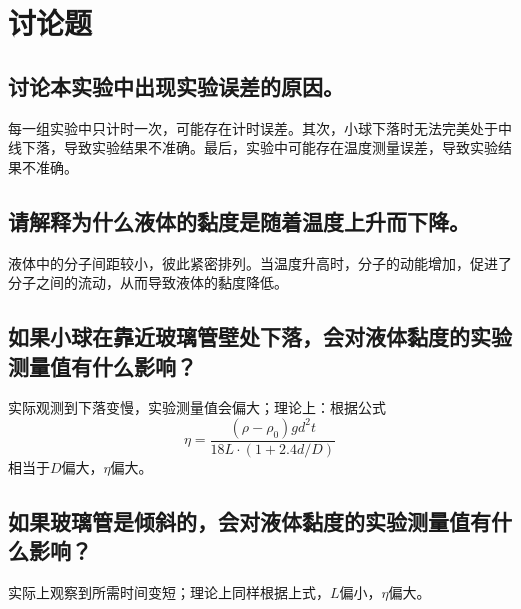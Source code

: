 \documentclass{ctexart}
\begin{document}
\section{讨论题}

\subsection{讨论本实验中出现实验误差的原因。}

每一组实验中只计时一次，可能存在计时误差。其次，小球下落时无法完美处于中线下落，导致实验结果不准确。最后，实验中可能存在温度测量误差，导致实验结果不准确。

\subsection{请解释为什么液体的黏度是随着温度上升而下降。}

液体中的分子间距较小，彼此紧密排列。当温度升高时，分子的动能增加，促进了分子之间的流动，从而导致液体的黏度降低。

\subsection{如果小球在靠近玻璃管壁处下落，会对液体黏度的实验测量值有什么影响？}

实际观测到下落变慢，实验测量值会偏大；理论上：根据公式$$\eta = \frac{(\rho-\rho_0)gd^2t}{18L\cdot (1+2.4d/D)}$$相当于$D$偏大，$\eta$偏大。

\subsection{如果玻璃管是倾斜的，会对液体黏度的实验测量值有什么影响？}

实际上观察到所需时间变短；理论上同样根据上式，$L$偏小，$\eta$偏大。
\end{document}
